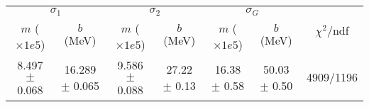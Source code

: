\begin{tabular}{cc|cc|cc||c}
\multicolumn{2}{c|}{$\sigma_1$} & \multicolumn{2}{|c}{$\sigma_2$} & \multicolumn{2}{|c}{$\sigma_G$}  & \multirow{2}{*}{$\chi^2/$ndf}\\
$m$ ($\times1e5$) & $b$ (MeV) & $m$ ($\times1e5$) & $b$ (MeV) & $m$ ($\times1e5$) & $b$ (MeV) & \\
\hline
8.497 $\pm$ 0.068 & 16.289 $\pm$ 0.065 & 9.586 $\pm$ 0.088 & 27.22 $\pm$ 0.13 & 16.38 $\pm$ 0.58 & 50.03 $\pm$ 0.50 & 4909/1196\\
\end{tabular}
